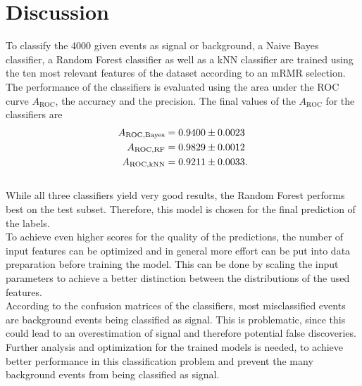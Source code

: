 \section{Discussion}
\label{sec:Discussion}

To classify the 4000 given events as signal or background, a Naive Bayes classifier, a Random Forest classifier as well as a kNN classifier are 
trained using the ten most relevant features of the dataset according to an mRMR selection. The performance of the classifiers is evaluated using
the area under the ROC curve $A_{\mathrm{ROC}}$, the accuracy and the precision. The final values of the $A_{\mathrm{ROC}}$ for the classifiers are
\begin{align*}
    A_{\mathrm{ROC, Bayes}} &= \num{0.9400+-0.0023} \\
    A_{\mathrm{ROC, RF}} &= \num{0.9829(0.0012)} \\
    A_{\mathrm{ROC, kNN}} &= \num{0.9211 \pm 0.0033}.
\end{align*}
\\While all three classifiers yield very good results, the Random Forest performs best on the test subset. Therefore, this model is chosen for the 
final prediction of the labels.\\
To achieve even higher scores for the quality of the predictions, the number of input features can be optimized and in general more
effort can be put into data preparation before training the model. This can be done by scaling the input parameters to achieve a better distinction 
between the distributions of the used features.\\
According to the confusion matrices of the classifiers, most misclassified events are background events being classified as signal. This is
problematic, since this could lead to an overestimation of signal and therefore potential false discoveries.\\
Further analysis and optimization for the trained models is needed, to achieve better performance in this classification problem and prevent
the many background events from being classified as signal.

